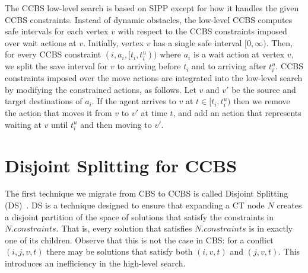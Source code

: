 \documentclass[letterpaper]{article} %
\newcommand\roni[1]{\nb{\textbf{Roni:}}{orange}{#1}}
\newcommand{\cbs}{\ac{CBS}\xspace}
\newcommand{\ccbs}{\ac{CCBS}\xspace}
\newcommand{\ct}{\ac{CT}\xspace}
\newcommand{\sipp}{\ac{SIPP}\xspace}
\newcommand{\const}{\textit{constraints}\xspace}
\newcommand{\ds}{\ac{DS}\xspace}
\begin{document}
The \ccbs low-level search is based on \sipp except for how it handles the given \ccbs constraints. 
Instead of dynamic obstacles, the low-level \ccbs computes safe intervals for each vertex $v$ with respect to the \ccbs constraints imposed over wait actions at $v$. 
Initially, vertex $v$ has a single safe interval $[0, \infty)$. 
Then, for every \ccbs constraint $(i, a_i, [t_i, t_i^u))$ 
where $a_i$ is a wait action at vertex $v$, we split the save interval for $v$ 
to arriving before $t_i$ and to arriving after $t_i^u$. 
\ccbs constraints imposed over the move actions are integrated into the low-level search by modifying the constrained actions, as follows. 
Let $v$ and $v'$ be the source and target destinations of $a_i$. 
If the agent arrives to $v$ at $t\in [t_i, t^u_i)$ then we remove the action that moves it from $v$ to $v'$ at time $t$, and add an action that represents waiting at $v$ until $t^u_i$ and then moving to $v'$.






\section{Disjoint Splitting for \ccbs}

The first technique we migrate from \cbs to \ccbs is called Disjoint Splitting (\ds)~\cite{li2019disjoint}. 
\ds is a technique designed to ensure that expanding a \ct node $N$ creates a disjoint partition of the space of solutions that satisfy the constraints in $N.\const$.  
That is, every solution that satisfies $N.\const$ is in exactly one of its children. Observe that this is not the case in \cbs: for a conflict $(i,j,v,t)$ there may be solutions that satisfy both $(i,v,t)$ and $(j,v,t)$. 
This introduces an inefficiency in the high-level search. 
\end{document}
